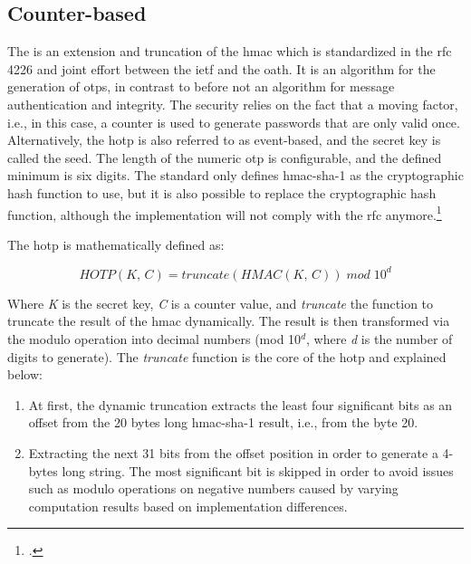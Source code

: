 \subsection{Counter-based}
\label{subsec:hotp}

The  is an extension and truncation of the \gls{hmac} which is standardized in the \gls{rfc} 4226 and joint effort between the \gls{ietf} and the \gls{oath}. It is an algorithm for the generation of \glspl{otp}, in contrast to before not an algorithm for message authentication and integrity. The security relies on the fact that a \frqq moving factor\flqq{}, i.e., in this case, a counter is used to generate passwords that are only valid once. Alternatively, the \gls{hotp} is also referred to as event-based, and the secret key is called the seed. The length of the numeric \gls{otp} is configurable, and the defined minimum is six digits. The standard only defines \gls{hmac}-\gls{sha}-1 as the cryptographic hash function to use, but it is also possible to replace the cryptographic hash function, although the implementation will not comply with the \gls{rfc} anymore.\footcites[See][]{m2005rfc}[See][Chapter 3]{9781849287333}

The \gls{hotp} is mathematically defined as:

\begin{equation*}
	HOTP(K,\, C) = truncate(HMAC(K,\, C))\; mod \; 10^d
\end{equation*}

Where \textit{K} is the secret key, \textit{C} is a counter value, and \textit{truncate} the function to truncate the result of the \gls{hmac} dynamically. The result is then transformed via the modulo operation into decimal numbers 	(mod 10$^d$, where \textit{d} is the number of digits to generate). The \textit{truncate} function is the core of the \gls{hotp} and explained below:

\begin{enumerate}
	\item At first, the dynamic truncation extracts the least four significant bits as an offset from the 20 bytes long \gls{hmac}-\gls{sha}-1 result, i.e., from the byte 20.
	\item Extracting the next 31 bits from the offset position in order to generate a 4-bytes long string. The most significant bit is skipped in order to avoid issues such as modulo operations on negative numbers caused by varying computation results based on implementation differences.
\end{enumerate}

